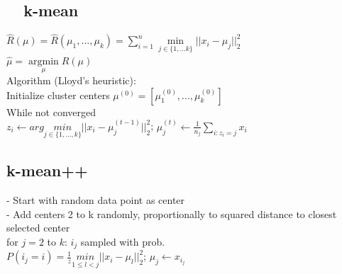 \subsection*{ ~~k-mean}

$\hat{R}(\mu) = \hat{R}(\mu_1,...,\mu_k) = \sum_{i=1}^n \underset{j\in\{1,...k\}}{\operatorname{min}}||x_i-\mu_j||_2^2$\\
$\hat{\mu} =  \underset{\mu}{\operatorname{argmin}} \hat{R}(\mu)$\\
Algorithm (Lloyd's heuristic):\\
Initialize cluster centers $\mu^{(0)} = [\mu_1^{(0)},...,\mu_k^{(0)}]$\\
While not converged\\
$z_i \leftarrow arg \underset{j\in\{1,...,k\}}{min}||x_i - \mu_j^{(t-1)}||_2^2$; $\mu_j^{(t)} \leftarrow \frac{1}{n_j}\sum_{i:z_i=j}x_i$

\subsection*{k-mean++}
- Start with random data point as center\\
- Add centers 2 to k randomly, proportionally to squared distance to closest selected center\\
for $j=2$ to $k$:
$i_j$ sampled with prob.\\
$P(i_j=i) = \frac{1}{z} \underset{1\leq l<j}{min}||x_i-\mu_l||_2^2$; $\mu_j \leftarrow x_{i_j}$